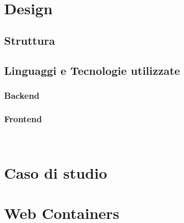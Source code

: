 \documentclass[12pt,a4paper,openright,twoside]{book}
\begin{document}
\

\chapter{Design}
\label{chap:design}

\section{Struttura}

\section{Linguaggi e Tecnologie utilizzate}
\subsection{Backend}
\subsection{Frontend}

\

\chapter{Caso di studio}
\label{chap:caso di studio}


\chapter{Web Containers}
\label{chap:web containers}




\backmatter




\begin{conclusions}
\end{conclusions}

\begin{acknowledgements}
\end{acknowledgements}
\end{document}
